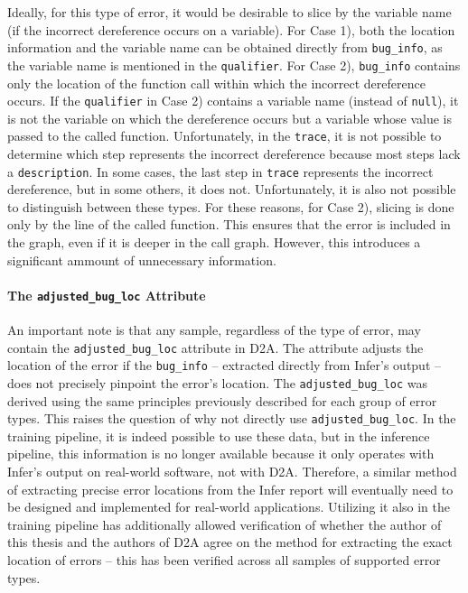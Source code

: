 Ideally, for this type of error, it would be desirable to slice by the variable name (if the incorrect dereference occurs on a variable). For Case 1), both the location information and the variable name can be obtained directly from \texttt{bug\_info}, as the variable name is mentioned in the \texttt{qualifier}. For Case 2), \texttt{bug\_info} contains only the location of the function call within which the incorrect dereference occurs. If the \texttt{qualifier} in Case 2) contains a variable name (instead of \texttt{null}), it is not the variable on which the dereference occurs but a variable whose value is passed to the called function. Unfortunately, in the \texttt{trace}, it is not possible to determine which step represents the incorrect dereference because most steps lack a \texttt{description}. In some cases, the last step in \texttt{trace} represents the incorrect dereference, but in some others, it does not. Unfortunately, it is also not possible to distinguish between these types. For these reasons, for Case 2), slicing is done only by the line of the called function. This ensures that the error is included in the graph, even if it is deeper in the call graph. However, this introduces a significant ammount of unnecessary information.

\paragraph{The \texttt{adjusted\_bug\_loc} Attribute}
An important note is that any sample, regardless of the type of error, may contain the \texttt{adjusted\_bug\_loc} attribute in D2A. The attribute adjusts the location of the error if the \texttt{bug\_info} -- extracted directly from Infer's output -- does not precisely pinpoint the error's location. The \texttt{adjusted\_bug\_loc} was derived using the same principles previously described for each group of error types. This raises the question of why not directly use \texttt{adjusted\_bug\_loc}. In the training pipeline, it is indeed possible to use these data, but in the inference pipeline, this information is no longer available because it only operates with Infer's output on real-world software, not with D2A. Therefore, a similar method of extracting precise error locations from the Infer report will eventually need to be designed and implemented for real-world applications. Utilizing it also in the training pipeline has additionally allowed verification of whether the author of this thesis and the authors of D2A agree on the method for extracting the exact location of errors -- this has been verified across all samples of supported error types.

